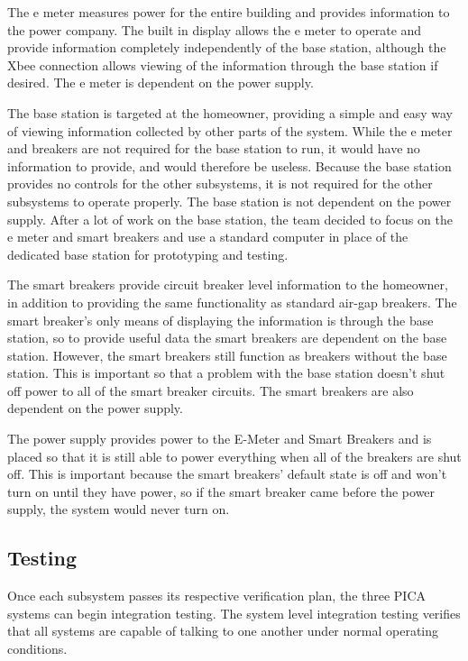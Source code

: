 The e meter measures power for the entire building and provides information to the power company. The built in display allows the e meter to operate and provide information completely independently of the base station, although the Xbee connection allows viewing of the information through the base station if desired. The e meter is dependent on the power supply.

The base station is targeted at the homeowner, providing a simple and easy way of viewing information collected by other parts of the system. While the e meter and breakers are not required for the base station to run, it would have no information to provide, and would therefore be useless. Because the base station provides no controls for the other subsystems, it is not required for the other subsystems to operate properly. The base station is not dependent on the power supply. After a lot of work on the base station, the team decided to focus on the e meter and smart breakers and use a standard computer in place of the dedicated base station for prototyping and testing.

The smart breakers provide circuit breaker level information to the homeowner, in addition to providing the same functionality as standard air-gap breakers. The smart breaker's only means of displaying the information is through the base station, so to provide useful data the smart breakers are dependent on the base station. However, the smart breakers still function as breakers without the base station. This is important so that a problem with the base station doesn't shut off power to all of the smart breaker circuits. The smart breakers are also dependent on the power supply.

The power supply provides power to the E-Meter and Smart Breakers and is placed so that it is still able to power everything when all of the breakers are shut off. This is important because the smart breakers' default state is off and won't turn on until they have power, so if the smart breaker came before the power supply, the system would never turn on. 

\subsection{Testing}
Once each subsystem passes its respective verification plan, the three PICA systems can begin integration testing. The system level integration testing verifies that all systems are capable of talking to one another under normal operating conditions.
